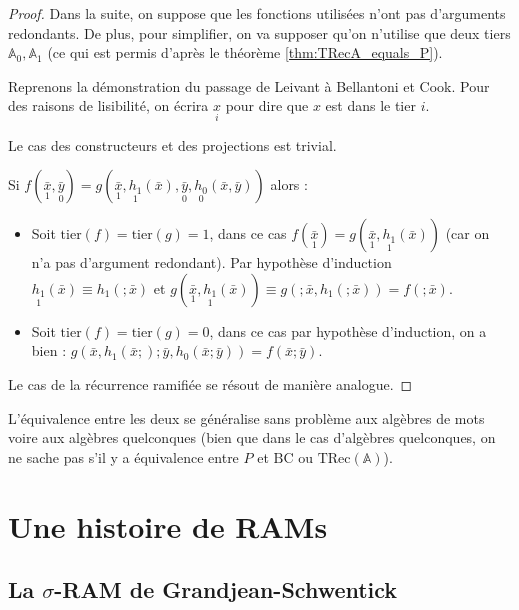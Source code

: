 \documentclass{report}
\newcommand{\bbA}{\mathbb{A}}
\newcommand{\TRec}[1]{\text{TRec}\left(\mathbb{#1}\right)}
\begin{document}
\begin{proof}
				Dans la suite, on suppose que les fonctions utilisées n'ont pas d'arguments redondants. De plus, pour simplifier, on va supposer qu'on n'utilise que deux tiers $\bbA_0, \bbA_1$ (ce qui est permis d'après le théorème \ref{thm:TRecA_equals_P}).
				
				Reprenons la démonstration du passage de Leivant à Bellantoni et Cook. Pour des raisons de lisibilité, on écrira $\underset{i}{x}$ pour dire que $x$ est dans le tier $i$.
				
				Le cas des constructeurs et des projections est trivial.
				
				Si $f(\underset{1}{\bar{x}}, \underset{0}{\bar{y}}) = g( \underset{1}{\bar{x}}, \underset{1}{h_1}(\bar{x}), \underset{0}{\bar{y}}, \underset{0}{h_0}(\bar{x}, \bar{y}))$ alors :
				
				\begin{itemize}[itemsep=-1mm]
					\item 	Soit $\text{tier}(f) = \text{tier}(g) = 1$, dans ce cas $f(\underset{1}{\bar{x}}) = g( \underset{1}{\bar{x}}, \underset{1}{h_1}(\bar{x}))$ (car on n'a pas d'argument redondant). Par hypothèse d'induction $\underset{1}{h_1}(\bar{x}) \equiv h_1(;\bar{x})$ et $g(\underset{1}{\bar{x}}, \underset{1}{h_1}(\bar{x})) \equiv g(; \bar{x}, h_1(;\bar{x})) = f(; \bar{x})$.
					
					\item 	Soit $\text{tier}(f) = \text{tier}(g) = 0$, dans ce cas par hypothèse d'induction, on a bien : $g( \bar{x}, h_1(\bar{x};) ; \bar{y}, h_0(\bar{x}; \bar{y})) = f(\bar{x} ; \bar{y})$.
				\end{itemize}
				
				Le cas de la récurrence ramifiée se résout de manière analogue.
			\end{proof}
			
	
			L'équivalence entre les deux se généralise sans problème aux algèbres de mots voire aux algèbres quelconques (bien que dans le cas d'algèbres quelconques, on ne sache pas s'il y a équivalence entre $P$ et $\text{BC}$ ou $\TRec{A}$).
			
		
	\espace
	
	\espace
			
			
	\section{Une histoire de RAMs}
	\label{sec:RAM_story}

	
		\subsection{La $\sigma$-RAM de Grandjean-Schwentick}
		\label{subsec:sigma_RAM}
		
\end{document}
